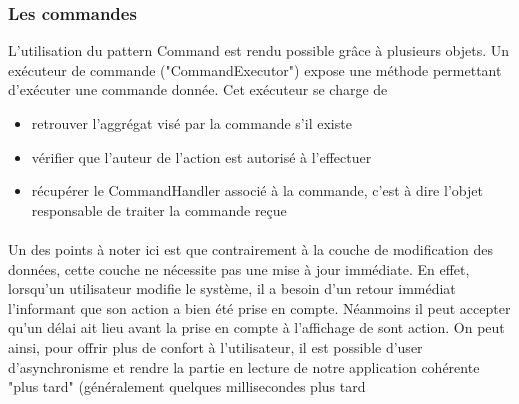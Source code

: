 \subsubsection{Les commandes}
\label{subs:Les commandes}
L'utilisation du pattern Command est rendu possible grâce à plusieurs objets.
Un exécuteur de commande ("CommandExecutor") expose une méthode permettant d'exécuter une commande donnée.
Cet exécuteur se charge de
\begin{itemize}
  \item retrouver l'aggrégat visé par la commande s'il existe
  \item vérifier que l'auteur de l'action est autorisé à l'effectuer
  \item récupérer le CommandHandler associé à la commande, c'est à dire l'objet responsable de traiter la commande reçue
\end{itemize}


\paragraph{} %
Un des points à noter ici est que contrairement à la couche de modification des données, cette couche ne nécessite pas une mise à jour immédiate.
En effet, lorsqu'un utilisateur modifie le système, il a besoin d'un retour immédiat l'informant que son action a bien été prise en compte.
Néanmoins il peut accepter qu'un délai ait lieu avant la prise en compte à l'affichage de sont action.
On peut ainsi, pour offrir plus de confort à l'utilisateur, il est possible d'user d'asynchronisme et rendre la partie en lecture de notre application cohérente "plus tard" (généralement quelques millisecondes plus tard
